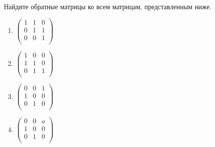 \documentclass[pdftex,11pt,openany]{book}\usepackage[]{graphicx}\usepackage[]{color}
\begin{document}
\begin{problem}
Найдите обратные матрицы ко всем матрицам, представленным ниже.
\begin{enumerate}
\item
\ensuremath{%
\begin{pmatrix}{}
    1 &   1 &   0 \\ 
    0 &   1 &   1 \\ 
    0 &   0 &   1 \\ 
  \end{pmatrix}
}

\item
\ensuremath{%
\begin{pmatrix}{}
    1 &   0 &   0 \\ 
    1 &   1 &   0 \\ 
    0 &   1 &   1 \\ 
  \end{pmatrix}
}

\item
\ensuremath{%
\begin{pmatrix}{}
    0 &   0 &   1 \\ 
    1 &   0 &   0 \\ 
    0 &   1 &   0 \\ 
  \end{pmatrix}
}

\item
\ensuremath{%
\begin{pmatrix}{}
  0 & 0 & a \\ 
  1 & 0 & 0 \\ 
  0 & 1 & 0 \\ 
  \end{pmatrix}
}

\end{enumerate}
\end{problem}

\begin{solution}
\end{solution}
\end{document}
